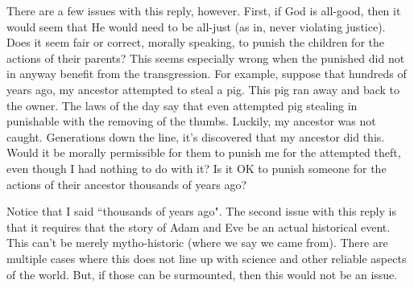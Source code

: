 There are a few issues with this reply, however. First, if God is all-good, then it would seem that He would need to be all-just (as in, never violating justice). Does it seem fair or correct, morally speaking, to punish the children for the actions of their parents? This seems especially wrong when the punished did not in anyway benefit from the transgression. For example, suppose that hundreds of years ago, my ancestor attempted to steal a pig. This pig ran away and back to the owner. The laws of the day say that even attempted pig stealing in punishable with the removing of the thumbs. Luckily, my ancestor was not caught. Generations down the line, it's discovered that my ancestor did this. Would it be morally permissible for them to punish me for the attempted theft, even though I had nothing to do with it? Is it OK to punish someone for the actions of their ancestor thousands of years ago?

Notice that I said ``thousands of years ago". The second issue with this reply is that it requires that the story of Adam and Eve be an actual historical event. This can't be merely mytho-historic (where we say we came from). There are multiple cases where this does not line up with science and other reliable aspects of the world. But, if those can be surmounted, then this would not be an issue.

